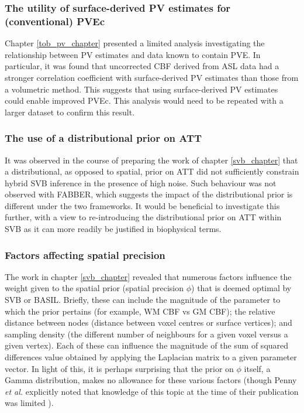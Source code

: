 \subsubsection{The utility of surface-derived PV estimates for (conventional) PVEc}

Chapter \ref{tob_pv_chapter} presented a limited analysis investigating the relationship between PV estimates and data known to contain PVE. In particular, it was found that uncorrected CBF derived from ASL data had a stronger correlation coefficient with surface-derived PV estimates than those from a volumetric method. This suggests that using surface-derived PV estimates could enable improved PVEc. This analysis would need to be repeated with a larger dataset to confirm this result. 

\subsubsection{The use of a distributional prior on ATT}

It was observed in the course of preparing the work of chapter \ref{svb_chapter} that a distributional, as opposed to spatial, prior on ATT did not sufficiently constrain hybrid SVB inference in the presence of high noise. Such behaviour was not observed with FABBER, which suggests the impact of the distributional prior is different under the two frameworks. It would be beneficial to investigate this further, with a view to re-introducing the distributional prior on ATT within SVB as it can more readily be justified in biophysical terms. 

\subsubsection{Factors affecting spatial precision} 

The work in chapter \ref{svb_chapter} revealed that numerous factors influence the weight given to the spatial prior (spatial precision $\phi$) that is deemed optimal by SVB or BASIL. Briefly, these can include the magnitude of the parameter to which the prior pertains (for example, WM CBF vs GM CBF); the relative distance between nodes (distance between voxel centres or surface vertices); and sampling density (the different number of neighbours for a given voxel versus a given vertex). Each of these can influence the magnitude of the sum of squared differences value obtained by applying the Laplacian matrix to a given parameter vector. In light of this, it is perhaps surprising that the prior on $\phi$ itself, a Gamma distribution, makes no allowance for these various factors (though Penny \textit{et al.} explicitly noted that knowledge of this topic at the time of their publication was limited \cite{Penny2005}). 

